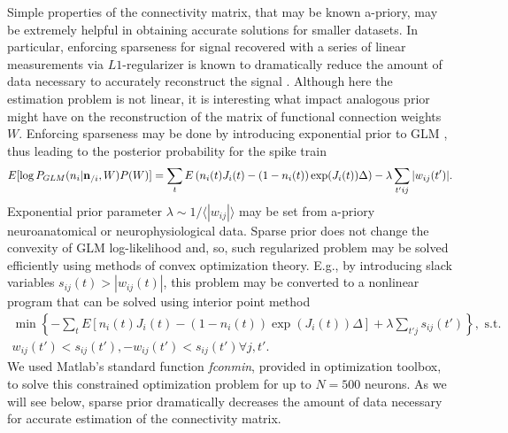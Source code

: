 \documentclass[amsmath,amssymb]{revtex4}
\begin{document}
Simple properties of the connectivity matrix, that may be known a-priory, may be extremely helpful in obtaining accurate solutions for smaller datasets. In particular, enforcing sparseness for signal recovered with a series of linear measurements via $L1$-regularizer is known to dramatically reduce the amount of data necessary to accurately reconstruct the signal \cite{Candes2005,DE03,Mishchenko2009}. Although here the estimation problem is not linear, it is interesting what impact analogous prior might have on the reconstruction of the matrix of functional connection weights $W$.
Enforcing sparseness may be done by introducing exponential prior to GLM \cite{Stevenson2009}, thus leading to the posterior probability for the spike train
\begin{equation}\label{eqn:likelihoodsparseGLM}
E[\log P_{GLM}(n_i|{\bf n}_{/i},W)P(W)]=\sum_t E\left( n_i(t) J_i(t) - (1-n_i(t)) \exp(J_i(t)) \Delta \right)-\lambda \sum_{t'ij}|w_{ij}(t')|.
\end{equation}
Exponential prior parameter $\lambda\sim 1/\langle|w_{ij}|\rangle$ may be set from a-priory neuroanatomical or neurophysiological data.
Sparse prior does not change the convexity of GLM log-likelihood and, so, such regularized problem may be solved efficiently using methods of convex optimization theory.
E.g., by introducing slack variables $s_{ij}(t)>|w_{ij}(t)|$, this problem may be converted to a nonlinear program that can be solved using interior point method
\begin{equation}\label{eqn:conconvexopt}
\begin{array}{l}
\min \left\{-\sum\limits_t E\left[ n_i(t) J_i(t) - (1-n_i(t)) \exp(J_i(t)) \Delta \right]+
\lambda \sum\limits_{t'j}s_{ij}(t')\right\}, \text{ s.t. }\\
w_{ij}(t')<s_{ij}(t'), -w_{ij}(t')<s_{ij}(t') \forall j,t'.
\end{array}
\end{equation}
We used Matlab's standard function {\em fconmin}, provided in optimization toolbox, to solve this constrained optimization problem for up to $N=500$ neurons. As we will see below, sparse prior dramatically decreases the amount of data necessary for accurate estimation of the connectivity matrix.
\end{document}
